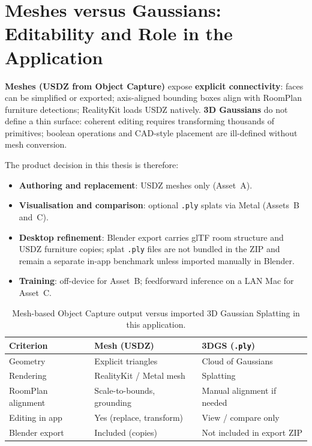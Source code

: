 \section{Meshes versus Gaussians: Editability and Role in the Application}
\label{sec:3dgs_vs_mesh}

\textbf{Meshes (USDZ from Object Capture)} expose \textbf{explicit connectivity}: faces can be simplified or exported; axis-aligned bounding boxes align with RoomPlan furniture detections; RealityKit loads USDZ natively. \textbf{3D Gaussians} \cite{kerbl20233dgs} do not define a thin surface: coherent editing requires transforming thousands of primitives; boolean operations and CAD-style placement are ill-defined without mesh conversion.

The product decision in this thesis is therefore:

\begin{itemize}
    \item \textbf{Authoring and replacement}: USDZ meshes only (Asset~A).
    \item \textbf{Visualisation and comparison}: optional \texttt{.ply} splats via Metal (Assets~B and~C).
    \item \textbf{Desktop refinement}: Blender export carries glTF room structure and USDZ furniture copies; splat \texttt{.ply} files are not bundled in the ZIP and remain a separate in-app benchmark unless imported manually in Blender.
    \item \textbf{Training}: off-device for Asset~B; feedforward inference on a LAN Mac for Asset~C.
\end{itemize}

\begin{table}[htbp]
\centering
\caption{Mesh-based Object Capture output versus imported 3D Gaussian Splatting in this application.}
\label{tab:mesh_vs_3dgs}
\begin{tabular}{|p{}|p{}|p{}|}
\hline
\textbf{Criterion} & \textbf{Mesh (USDZ)} & \textbf{3DGS (\texttt{.ply})} \\
\hline
Geometry & Explicit triangles & Cloud of Gaussians \\
\hline
Rendering & RealityKit / Metal mesh & Splatting \cite{kerbl20233dgs} \\
\hline
RoomPlan alignment & Scale-to-bounds, grounding & Manual alignment if needed \\
\hline
Editing in app & Yes (replace, transform) & View / compare only \\
\hline
Blender export & Included (copies) & Not included in export ZIP \\
\hline
\end{tabular}
\end{table}

